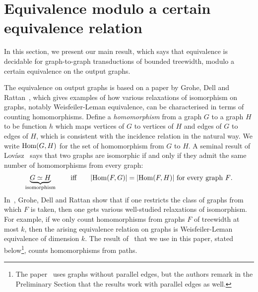 
\section{Equivalence  modulo a certain equivalence relation}\label{sec:equivalence-modulo}
In this section, we present our main result, which says  that equivalence is decidable for graph-to-graph transductions of bounded treewidth, modulo a certain equivalence on the output graphs. 

 The equivalence on output graphs is based on a paper by Grohe, Dell and Rattan~\cite{groheDellRattan2018}, which gives examples of how various relaxations of isomorphism on graphs, notably Weisfeiler-Leman equivalence, can be characterised in terms of counting homomorphisms. 
Define a \emph{homomorphism} from a graph $G$ to a graph $H$ to be  function $h$ which maps vertices  of $G$ to vertices of $H$ and edges of $G$ to edges of $H$, which is consistent with the incidence relation in the natural way. We write $\mathrm {Hom}(G,H)$ for the set of homomorphism from $G$ to $H$. A seminal result of  Lov\'asz~\cite[p.~326]{lovasz1967operations} says that two graphs are isomorphic if and only if they admit the same number of homomorphisms from every graph:
\begin{align*}
\underbrace{G \simeq H}_{\text{isomorphism}} \qquad \text{iff} \qquad  |\mathrm {Hom}(F,G)|=|\mathrm {Hom}(F,H)| \ \text{for every graph $F$.}
\end{align*}
In~\cite{groheDellRattan2018},
Grohe, Dell and Rattan show that if one restricts the  class of graphs from which $F$ is taken, then one gets various well-studied relaxations of isomorphism. For example, if we only count homomorphisms from graphs $F$ of treewidth at most $k$, then the arising equivalence relation on graphs is Weisfeiler-Leman equivalence of dimension $k$.  The result of~\cite{groheDellRattan2018}  that we use in this paper, stated below\footnote{
    The paper~\cite{groheDellRattan2018} uses graphs without parallel edges, but the authors remark  in the Preliminary Section that the results work with parallel edges as well.
}, counts homomorphisms from paths. 


